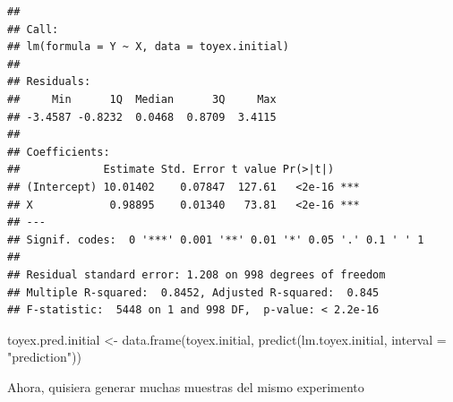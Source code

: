 \documentclass[
  12pt,
]{book}
\newenvironment{Shaded}{\begin{snugshade}}{\end{snugshade}}
\newcommand{\AttributeTok}[1]{\textcolor[rgb]{0.77,0.63,0.00}{#1}}
\newcommand{\FunctionTok}[1]{\textcolor[rgb]{0.00,0.00,0.00}{#1}}
\newcommand{\NormalTok}[1]{#1}
\newcommand{\OtherTok}[1]{\textcolor[rgb]{0.56,0.35,0.01}{#1}}
\newcommand{\StringTok}[1]{\textcolor[rgb]{0.31,0.60,0.02}{#1}}
\begin{document}
\begin{verbatim}
## 
## Call:
## lm(formula = Y ~ X, data = toyex.initial)
## 
## Residuals:
##     Min      1Q  Median      3Q     Max 
## -3.4587 -0.8232  0.0468  0.8709  3.4115 
## 
## Coefficients:
##             Estimate Std. Error t value Pr(>|t|)    
## (Intercept) 10.01402    0.07847  127.61   <2e-16 ***
## X            0.98895    0.01340   73.81   <2e-16 ***
## ---
## Signif. codes:  0 '***' 0.001 '**' 0.01 '*' 0.05 '.' 0.1 ' ' 1
## 
## Residual standard error: 1.208 on 998 degrees of freedom
## Multiple R-squared:  0.8452, Adjusted R-squared:  0.845 
## F-statistic:  5448 on 1 and 998 DF,  p-value: < 2.2e-16
\end{verbatim}

\begin{Shaded}
\begin{Highlighting}[]
\NormalTok{toyex.pred.initial }\OtherTok{\textless{}{-}} \FunctionTok{data.frame}\NormalTok{(toyex.initial, }\FunctionTok{predict}\NormalTok{(lm.toyex.initial,}
    \AttributeTok{interval =} \StringTok{"prediction"}\NormalTok{))}
\end{Highlighting}
\end{Shaded}

Ahora, quisiera generar muchas muestras del mismo experimento
\end{document}
